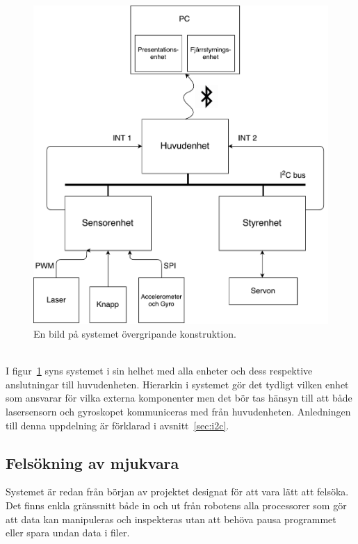 \documentclass{article}
\begin{document}
\begin{figure}[H]
\centering
\includegraphics[scale=0.4]{oversikt_systemet}
\caption{En bild på systemet övergripande konstruktion.}
\label{fig:oversikt_systemet}
\end{figure}
\ \\
I figur~\ref{fig:oversikt_systemet} syns systemet i sin helhet med alla enheter och dess respektive anslutningar till huvudenheten. Hierarkin i systemet gör det tydligt vilken enhet som ansvarar för vilka externa komponenter men det bör tas hänsyn till att både lasersensorn och gyroskopet kommuniceras med från huvudenheten. Anledningen till denna uppdelning är förklarad i avsnitt~\ref{sec:i2c}.

\subsection{Felsökning av mjukvara}
Systemet är redan från början av projektet designat för att vara lätt att felsöka. Det finns enkla gränssnitt både in och ut från robotens alla processorer som gör att data kan manipuleras och inspekteras utan att behöva pausa programmet eller spara undan data i filer.
\end{document}
